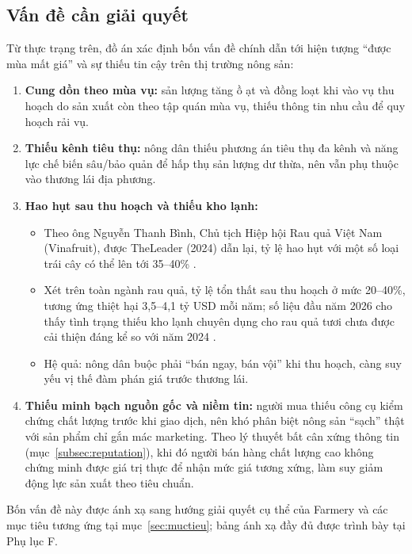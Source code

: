 \subsection{Vấn đề cần giải quyết}
\label{sec:vande}

Từ thực trạng trên, đồ án xác định bốn vấn đề chính dẫn tới hiện tượng ``được mùa mất giá'' và sự thiếu tin cậy trên thị trường nông sản:

\begin{enumerate}
    \item[\textbf{V1.}] \textbf{Cung dồn theo mùa vụ:} sản lượng tăng ồ ạt và đồng loạt khi vào vụ thu hoạch do sản xuất còn theo tập quán mùa vụ, thiếu thông tin nhu cầu để quy hoạch rải vụ.
    \item[\textbf{V2.}] \textbf{Thiếu kênh tiêu thụ:} nông dân thiếu phương án tiêu thụ đa kênh và năng lực chế biến sâu/bảo quản để hấp thụ sản lượng dư thừa, nên vẫn phụ thuộc vào thương lái địa phương.
    \item[\textbf{V3.}] \textbf{Hao hụt sau thu hoạch và thiếu kho lạnh:}
    \begin{itemize}
        \item Theo ông Nguyễn Thanh Bình, Chủ tịch Hiệp hội Rau quả Việt Nam (Vinafruit), được TheLeader (2024) dẫn lại, tỷ lệ hao hụt với một số loại trái cây có thể lên tới 35--40\% \parencite{theleader_2024}.
        \item Xét trên toàn ngành rau quả, tỷ lệ tổn thất sau thu hoạch ở mức 20--40\%, tương ứng thiệt hại 3,5--4,1 tỷ USD mỗi năm; số liệu đầu năm 2026 cho thấy tình trạng thiếu kho lạnh chuyên dụng cho rau quả tươi chưa được cải thiện đáng kể so với năm 2024 \parencite{tuoitre_2026}.
        \item Hệ quả: nông dân buộc phải ``bán ngay, bán vội'' khi thu hoạch, càng suy yếu vị thế đàm phán giá trước thương lái.
    \end{itemize}
    \item[\textbf{V4.}] \textbf{Thiếu minh bạch nguồn gốc và niềm tin:} người mua thiếu công cụ kiểm chứng chất lượng trước khi giao dịch, nên khó phân biệt nông sản ``sạch'' thật với sản phẩm chỉ gắn mác marketing. Theo lý thuyết bất cân xứng thông tin (mục~\ref{subsec:reputation}), khi đó người bán hàng chất lượng cao không chứng minh được giá trị thực để nhận mức giá tương xứng, làm suy giảm động lực sản xuất theo tiêu chuẩn.
\end{enumerate}

Bốn vấn đề này được ánh xạ sang hướng giải quyết cụ thể của Farmery và các mục tiêu tương ứng tại mục~\ref{sec:muctieu}; bảng ánh xạ đầy đủ được trình bày tại Phụ lục F.


